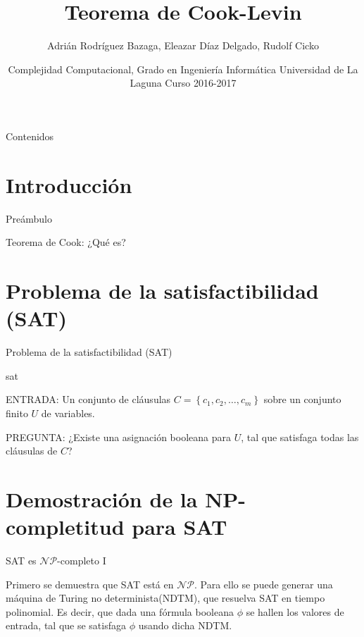 \documentclass[10pt, mathserif, profesionalfont]{beamer}
\title{Teorema de Cook-Levin}
\author{Adrián Rodríguez Bazaga, Eleazar Díaz Delgado, Rudolf Cicko}
\institute[Universidad de La Laguna]{Adrián Rodríguez Bazaga, Eleazar Díaz Delgado \and Rudolf Cicko} %
\date{Complejidad Computacional, Grado en Ingeniería Informática \newline Universidad de La Laguna \newline Curso 2016-2017}
\begin{document}
\begin{frame}
  \titlepage
\end{frame}

\begin{frame}{Contenidos}
  \tableofcontents
\end{frame}

\section{Introducción}

\begin{frame}{Preámbulo}

\begin{block}{Teorema de Cook: ¿Qué es?}

\end{block}

\end{frame}

\section{Problema de la satisfactibilidad (SAT)}

\begin{frame}{Problema de la satisfactibilidad (SAT)}

\begin{block}{\gls{sat}}
{\small
\noindent ENTRADA: Un conjunto de cláusulas $C=\left \{c_1, c_2, \dots, c_m \right \}$ sobre un conjunto finito $U$ de variables.

\noindent PREGUNTA: ¿Existe una asignación booleana para $U$, tal que satisfaga todas las cláusulas de $C$?
}
\end{block}

\end{frame}

\section{Demostración de la NP-completitud para SAT}

\begin{frame}{SAT es $\mathcal{NP}$-completo I}

  \begin{block}{}
    Primero se demuestra que SAT está en $\mathcal{NP}$. Para ello se puede generar
    una máquina de Turing no determinista(NDTM), que resuelva SAT en tiempo polinomial.
    Es decir, que dada una fórmula booleana $\phi$ se hallen los valores de entrada, tal
    que se satisfaga $\phi$ usando dicha NDTM.
  \end{block}

\end{frame}
\end{document}
